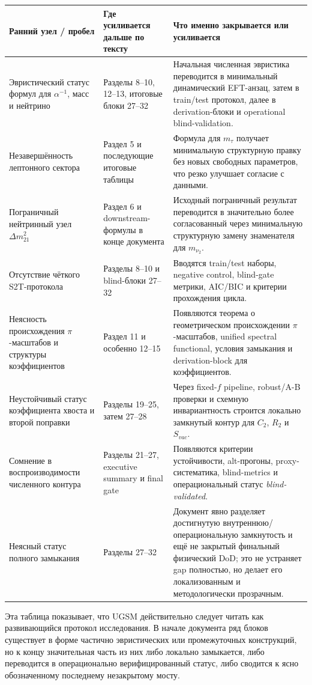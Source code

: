 \documentclass[12pt,a4paper]{article}
\begin{document}
\begin{longtable}{p{4.2cm}p{4.2cm}p{6cm}}
\toprule
Ранний узел / пробел & Где усиливается дальше по тексту & Что именно закрывается или усиливается \\
\midrule
\endhead
Эвристический статус формул для \(\alpha^{-1}\), масс и нейтрино & Разделы 8--10, 12--13, итоговые блоки 27--32 & Начальная численная эвристика переводится в минимальный динамический EFT-анзац, затем в train/test протокол, далее в derivation-блоки и operational blind-validation. \\
Незавершённость лептонного сектора & Раздел 5 и последующие итоговые таблицы & Формула для \(m_\tau\) получает минимальную структурную правку без новых свободных параметров, что резко улучшает согласие с данными. \\
Пограничный нейтринный узел \(\Delta m^2_{21}\) & Раздел 6 и downstream-формулы в конце документа & Исходный пограничный результат переводится в значительно более согласованный через минимальную структурную замену знаменателя для \(m_{\nu_2}\). \\
Отсутствие чёткого S2T-протокола & Разделы 8--10 и blind-блоки 27--32 & Вводятся train/test наборы, negative control, blind-gate метрики, AIC/BIC и критерии прохождения цикла. \\
Неясность происхождения \(\pi\)-масштабов и структуры коэффициентов & Раздел 11 и особенно 12--15 & Появляются теорема о геометрическом происхождении \(\pi\)-масштабов, unified spectral functional, условия замыкания и derivation-block для коэффициентов. \\
Неустойчивый статус коэффициента хвоста и второй поправки & Разделы 19--25, затем 27--28 & Через fixed-$f$ pipeline, robust/A-B проверки и схемную инвариантность строится локально замкнутый контур для \(C_2\), \(R_2\) и \(S_{vac}\). \\
Сомнение в воспроизводимости численного контура & Разделы 21--27, executive summary и final gate & Появляются критерии устойчивости, alt-прогоны, proxy-систематика, blind-metrics и операциональный статус \textit{blind-validated}. \\
Неясный статус полного замыкания & Разделы 27--32 & Документ явно разделяет достигнутую внутреннюю/операциональную замкнутость и ещё не закрытый финальный физический DoD; это не устраняет gap полностью, но делает его локализованным и методологически прозрачным. \\
\bottomrule
\end{longtable}

Эта таблица показывает, что UGSM действительно следует читать как развивающийся протокол исследования. В начале документа ряд блоков существует в форме частично эвристических или промежуточных конструкций, но к концу значительная часть из них либо локально замыкается, либо переводится в операционально верифицированный статус, либо сводится к ясно обозначенному последнему незакрытому мосту.
\end{document}
